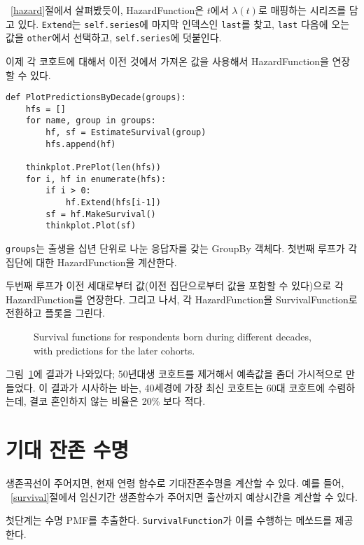 ~\ref{hazard}절에서 살펴봤듯이, HazardFunction은 $t$에서 $\lambda(t)$로 매핑하는 시리즈를 담고 있다. {\tt Extend}는 {\tt self.series}에 마지막 인덱스인 {\tt last}를 찾고, {\tt last} 다음에 오는 값을 {\tt other}에서 선택하고, {\tt self.series}에 덧붙인다.

이제 각 코호트에 대해서 이전 것에서 가져온 값을 사용해서 HazardFunction을 연장할 수 있다.

\begin{verbatim}
def PlotPredictionsByDecade(groups):
    hfs = []
    for name, group in groups:
        hf, sf = EstimateSurvival(group)
        hfs.append(hf)

    thinkplot.PrePlot(len(hfs))
    for i, hf in enumerate(hfs):
        if i > 0:
            hf.Extend(hfs[i-1])
        sf = hf.MakeSurvival()
        thinkplot.Plot(sf)
\end{verbatim}

{\tt groups}는 출생을 십년 단위로 나눈 응답자를 갖는 GroupBy 객체다.
첫번째 루프가 각 집단에 대한 HazardFunction을 계산한다.

두번째 루프가 이전 세대로부터 값(이전 집단으로부터 값을 포함할 수 있다)으로 각 HazardFunction를 연장한다.
그리고 나서, 각 HazardFunction을 SurvivalFunction로 전환하고 플롯을 그린다.

\begin{figure}
\caption{Survival functions for respondents born during different decades,
with predictions for the later cohorts.}
\label{survival5}
\end{figure}

그림~\ref{survival5}에 결과가 나와있다; 50년대생 코호트를 제거해서 예측값을 좀더 가시적으로 만들었다. 이 결과가 시사하는 바는, 40세경에 가장 최신 코호트는 60대 코호트에 수렴하는데, 결코 혼인하지 않는 비율은 20\% 보다 적다.


\section{기대 잔존 수명}

생존곡선이 주어지면, 현재 연령 함수로 기대잔존수명을 계산할 수 있다.
예를 들어, ~\ref{survival}절에서 임신기간 생존함수가 주어지면 출산까지 예상시간을 계산할 수 있다.

첫단계는 수명 PMF를 추출한다. {\tt SurvivalFunction}가 이를 수행하는 메쏘드를 제공한다.

